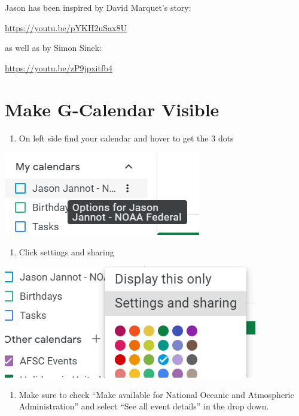 \documentclass[
  letterpaper,
  DIV=11,
  numbers=noendperiod]{scrreprt}
\providecommand{\tightlist}{%
  \setlength{\itemsep}{0pt}\setlength{\parskip}{0pt}}\usepackage{longtable,booktabs,array}
\begin{document}
Jason has been inspired by David Marquet's story:

\url{https://youtu.be/pYKH2uSax8U}

as well as by Simon Sinek:

\url{https://youtu.be/zP9jpxitfb4}

\hypertarget{sec-calendar}{%
\chapter{Make G-Calendar Visible}\label{sec-calendar}}

\begin{enumerate}
\def\labelenumi{\arabic{enumi}.}
\tightlist
\item
  On left side find your calendar and hover to get the 3 dots
\end{enumerate}

\includegraphics{_img/_gcalendar/pic1.png}

\begin{enumerate}
\def\labelenumi{\arabic{enumi}.}
\setcounter{enumi}{1}
\tightlist
\item
  Click settings and sharing
\end{enumerate}

\includegraphics{_img/_gcalendar/pic2.png}

\begin{enumerate}
\def\labelenumi{\arabic{enumi}.}
\setcounter{enumi}{2}
\tightlist
\item
  Make sure to check ``Make available for National Oceanic and
  Atmospheric Administration'' and select ``See all event details'' in
  the drop down.
\end{enumerate}
\end{document}
